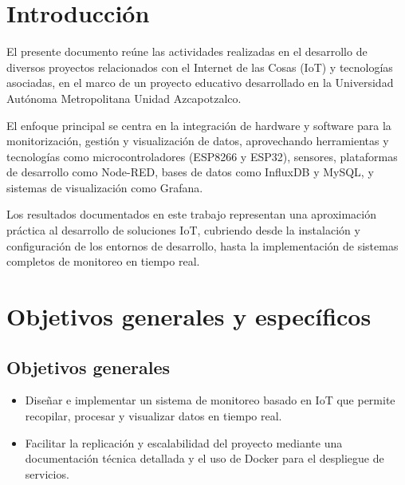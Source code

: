 \setcounter{page}{1}

\setcounter{section}{5}

\section{Introducción}

El presente documento reúne las actividades realizadas en el desarrollo de diversos proyectos relacionados con el Internet de las Cosas (IoT) y tecnologías asociadas, en el marco de un proyecto educativo desarrollado en la Universidad Autónoma Metropolitana Unidad Azcapotzalco.

El enfoque principal se centra en la integración de hardware y software para la monitorización, gestión y visualización de datos, aprovechando herramientas y tecnologías como microcontroladores (ESP8266 y ESP32), sensores, plataformas de desarrollo como Node-RED, bases de datos como InfluxDB y MySQL, y sistemas de visualización como Grafana.

Los resultados documentados en este trabajo representan una aproximación práctica al desarrollo de soluciones IoT, cubriendo desde la instalación y configuración de los entornos de desarrollo, hasta la implementación de sistemas completos de monitoreo en tiempo real.

\section{Objetivos generales y específicos}
    \subsection*{Objetivos generales}
    \begin{itemize}
        \item Diseñar e implementar un sistema de monitoreo basado en IoT que permite recopilar, procesar y visualizar datos en tiempo real.
        \item Facilitar la replicación y escalabilidad del proyecto mediante una documentación técnica detallada y el uso de Docker para el despliegue de servicios.
    \end{itemize}
